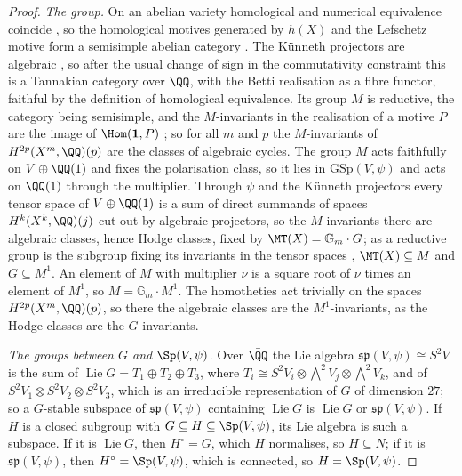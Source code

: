 \begin{proof}
\emph{The group.} On an abelian variety homological and numerical
equivalence coincide \cite{Lie68}, so the homological motives generated by
$h(X)$ and the Lefschetz motive form a semisimple abelian category
\cite{Jan92}. The K\"unneth projectors are algebraic \cite[\S2]{Kle68}, so
after the usual change of sign in the commutativity constraint this is a
Tannakian category over $\QQ$, with the Betti realisation as a fibre functor,
faithful by the definition of homological equivalence. Its group $M$ is
reductive, the category being semisimple, and the $M$-invariants in the
realisation of a motive $P$ are the image of $\Hom(\mathbf{1},P)$
\cite[Theorem~2.11]{DM82}; so for all $m$ and $p$ the $M$-invariants of
$H^{2p}(X^{m},\QQ)(p)$ are the classes of algebraic cycles. The group $M$ acts
faithfully on $V\oplus\QQ(1)$ and fixes the polarisation class, so it lies in
$\mathrm{GSp}(V,\psi)$ and acts on $\QQ(1)$ through the multiplier. Through
$\psi$ and the K\"unneth projectors every tensor space of $V\oplus\QQ(1)$ is a
sum of direct summands of spaces $H^{k}(X^{k},\QQ)(j)$ cut out by algebraic
projectors, so the $M$-invariants there are algebraic classes, hence Hodge
classes, fixed by $\MT(X)=\mathbb{G}_{m}\cdot G$; as a reductive group is the
subgroup fixing its invariants in the tensor spaces
\cite[Proposition~3.1]{Del82}, $\MT(X)\subseteq M$ and $G\subseteq M^{1}$. An
element of $M$ with multiplier $\nu$ is a square root of $\nu$ times an
element of $M^{1}$, so $M=\mathbb{G}_{m}\cdot M^{1}$. The homotheties act
trivially on the spaces $H^{2p}(X^{m},\QQ)(p)$, so there the algebraic classes
are the $M^{1}$-invariants, as the Hodge classes are the $G$-invariants.

\emph{The groups between $G$ and $\Sp(V,\psi)$.} Over $\bar{\QQ}$ the Lie
algebra $\mathfrak{sp}(V,\psi)\cong S^{2}V$ is the sum of
$\operatorname{Lie}G=T_{1}\oplus T_{2}\oplus T_{3}$, where $T_{i}\cong
S^{2}V_{i}\otimes{\textstyle\bigwedge^{2}}V_{j}\otimes{\textstyle\bigwedge^{2}}V_{k}$, and of
$S^{2}V_{1}\otimes S^{2}V_{2}\otimes S^{2}V_{3}$, which is an irreducible
representation of $G$ of dimension $27$; so a $G$-stable subspace of
$\mathfrak{sp}(V,\psi)$ containing $\operatorname{Lie}G$ is
$\operatorname{Lie}G$ or $\mathfrak{sp}(V,\psi)$. If $H$ is a closed
subgroup with $G\subseteq H\subseteq\Sp(V,\psi)$, its Lie algebra is such a
subspace. If it is $\operatorname{Lie}G$, then $H^{\circ}=G$, which $H$
normalises, so $H\subseteq N$; if it is $\mathfrak{sp}(V,\psi)$, then
$H^{\circ}=\Sp(V,\psi)$, which is connected, so $H=\Sp(V,\psi)$.


\end{proof}
